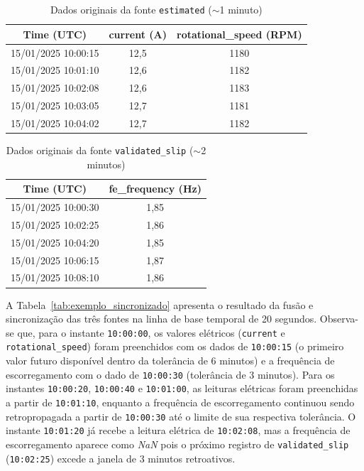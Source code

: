 \begin{table}[H]
    \centering
    \caption{Dados originais da fonte \texttt{estimated} ($\sim$1 minuto)}
    \label{tab:exemplo_estimated}
    \begin{tabular}{ccc}
        \hline
        \textbf{Time (UTC)} & \textbf{current (A)} & \textbf{rotational\_speed (RPM)} \\
        \hline
        15/01/2025 10:00:15 & 12,5 & 1180 \\
        15/01/2025 10:01:10 & 12,6 & 1182 \\
        15/01/2025 10:02:08 & 12,6 & 1183 \\
        15/01/2025 10:03:05 & 12,7 & 1181 \\
        15/01/2025 10:04:02 & 12,7 & 1182 \\
        \hline
    \end{tabular}
\end{table}

\begin{table}[H]
    \centering
    \caption{Dados originais da fonte \texttt{validated\_slip} ($\sim$2 minutos)}
    \label{tab:exemplo_slip}
    \begin{tabular}{cc}
        \hline
        \textbf{Time (UTC)} & \textbf{fe\_frequency (Hz)} \\
        \hline
        15/01/2025 10:00:30 & 1,85 \\
        15/01/2025 10:02:25 & 1,86 \\
        15/01/2025 10:04:20 & 1,85 \\
        15/01/2025 10:06:15 & 1,87 \\
        15/01/2025 10:08:10 & 1,86 \\
        \hline
    \end{tabular}
\end{table}

A Tabela~\ref{tab:exemplo_sincronizado} apresenta o resultado da fusão e sincronização das três fontes na linha de base temporal de 20 segundos. Observa-se que, para o instante \texttt{10:00:00}, os valores elétricos (\texttt{current} e \texttt{rotational\_speed}) foram preenchidos com os dados de \texttt{10:00:15} (o primeiro valor futuro disponível dentro da tolerância de 6 minutos) e a frequência de escorregamento com o dado de \texttt{10:00:30} (tolerância de 3 minutos). Para os instantes \texttt{10:00:20}, \texttt{10:00:40} e \texttt{10:01:00}, as leituras elétricas foram preenchidas a partir de \texttt{10:01:10}, enquanto a frequência de escorregamento continuou sendo retropropagada a partir de \texttt{10:00:30} até o limite de sua respectiva tolerância. O instante \texttt{10:01:20} já recebe a leitura elétrica de \texttt{10:02:08}, mas a frequência de escorregamento aparece como \textit{NaN} pois o próximo registro de \texttt{validated\_slip} (\texttt{10:02:25}) excede a janela de 3 minutos retroativos.

